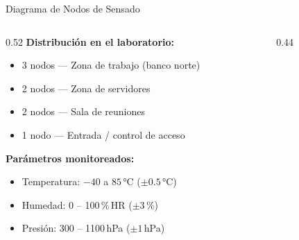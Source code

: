 \documentclass[aspectratio=169, 12pt]{beamer}
\begin{document}
\begin{frame}{Diagrama de Nodos de Sensado}
  \begin{columns}[T]
    \begin{column}{0.52\textwidth}
      \textbf{\color{AzulITM}Distribución en el laboratorio:}
      \begin{itemize}
        \item 3 nodos --- Zona de trabajo (banco norte)
        \item 2 nodos --- Zona de servidores
        \item 2 nodos --- Sala de reuniones
        \item 1 nodo --- Entrada / control de acceso
      \end{itemize}
      \vspace{0.4em}
      \textbf{\color{AzulITM}Parámetros monitoreados:}
      \begin{itemize}
        \item Temperatura: $-40$ a $85$\,°C ($\pm 0.5$\,°C)
        \item Humedad: 0 -- 100\,\%\,HR ($\pm 3$\,\%)
        \item Presión: 300 -- 1100\,hPa ($\pm 1$\,hPa)
      \end{itemize}
    \end{column}
    \begin{column}{0.44\textwidth}
      \begin{center}
      \end{center}
    \end{column}
  \end{columns}
\end{frame}
\end{document}
